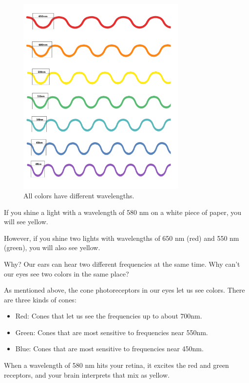\begin{figure}[htbp]
    \centering
    \includegraphics[width=0.75\textwidth]{Color_Waves.png}
    \caption{All colors have different wavelengths.}
    \label{fig:colorwavelengths}
\end{figure}

If you shine a light with a wavelength of 580 nm on a white piece of
paper, you will see yellow.

However, if you shine two lights with wavelengths of 650 nm (red) and
550 nm (green), you will also see yellow.

Why? Our ears can hear two different frequencies at the same time.
Why can't our eyes see two colors in the same place?

As mentioned above, the cone photoreceptors in our eyes let us see
colors. There are three kinds of cones:
\begin{itemize}
  \item Red: Cones that let us see the frequencies up to about 700nm.
  \item Green: Cones that are most sensitive to frequencies near 550nm.
  \item Blue: Cones that are most sensitive to frequencies near 450nm.
\end{itemize}

When a wavelength of 580 nm hits your retina, it excites the red
and green receptors, and your brain interprets that mix as yellow.

